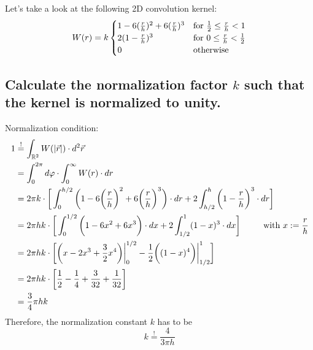 Let's take a look at the following 2D convolution kernel:
\begin{equation}
    W(r)=k\begin{cases}
        1-6(\frac{r}{h})^2+6(\frac{r}{h})^3 
        & \textnormal{for }\frac{1}{2}\leq\frac{r}{h}<1 \\
        2(1-\frac{r}{h})^3
        & \textnormal{for }0\leq\frac{r}{h}<\frac{1}{2} \\
        0 
        & \textnormal{otherwise} \\
    \end{cases}
\end{equation}

\subsection{Calculate the normalization factor $k$ such that the 
kernel is normalized to unity.}
    Normalization condition:
    \begin{align}
        1
        &\overset{!}{=}\int_{\mathbb{R}^2}W(|\vec r|)\cdot d^2\vec r \\
        &=\int_0^{2\pi}d\varphi\cdot\int_0^\infty W(r)\cdot dr \\
        &=2\pi k\cdot\bigg[
            \int_0^{h/2}\bigg(
                1-6\bigg(\frac{r}{h}\bigg)^2+
                6\bigg(\frac{r}{h}\bigg)^3
            \bigg)\cdot dr+2\int_{h/2}^h\bigg(1-\frac{r}{h}\bigg)^3\cdot dr
        \bigg] \\
        &=2\pi hk\cdot\bigg[
            \int_0^{1/2}\bigg(
                1-6x^2+
                6x^3
            \bigg)\cdot dx+2\int_{1/2}^1(1-x)^3\cdot dx
        \bigg] \ \ \ \ \ \ \ \ \textnormal{with $x:=\frac{r}{h}$} \\
        &=2\pi hk\cdot\bigg[
            \bigg(
                x-2x^3+\frac{3}{2}x^4
            \bigg)\bigg|_0^{1/2}-\frac{1}{2}\bigg(
                (1-x)^4
            \bigg)\bigg|_{1/2}^{1}
        \bigg] \\
        &=2\pi hk\cdot\bigg[
            \frac{1}{2}-\frac{1}{4}+\frac{3}{32}+\frac{1}{32}    
        \bigg] \\
        &=\frac{3}{4}\pi hk
    \end{align}
    Therefore, the normalization constant $k$ has to be
    \begin{equation}
        k\overset{!}{=}\frac{4}{3\pi h}
    \end{equation}

